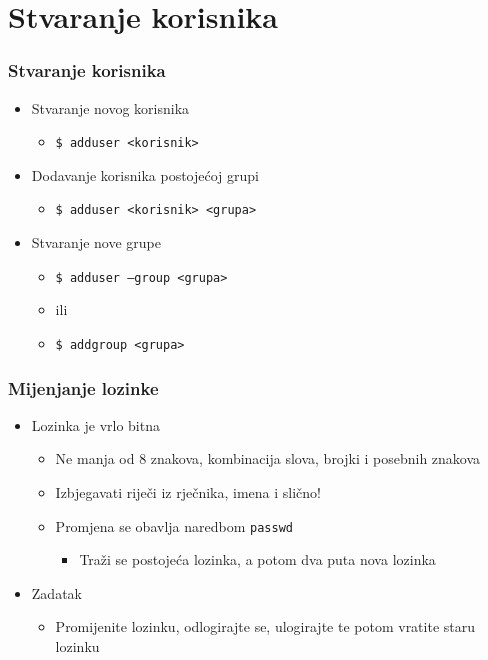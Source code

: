 \documentclass{beamer}
\newcommand{\shell}[1]{\texttt{#1}}
\begin{document}
\section{Stvaranje korisnika}
\begin{frame}[t]
\frametitle{Stvaranje korisnika}
\begin{itemize}
  \item Stvaranje novog korisnika
  \begin{itemize}
    \item[] \shell{\$ adduser <korisnik>}
  \end{itemize}
  \item Dodavanje korisnika postojećoj grupi
  \begin{itemize}
    \item[] \shell{\$ adduser <korisnik> <grupa>}
  \end{itemize}
  \item Stvaranje nove grupe
  \begin{itemize}
    \item[] \shell{\$ adduser --group <grupa>}
    \item[] ili
    \item[] \shell{\$ addgroup <grupa>}
  \end{itemize}
\end{itemize}
\end{frame}

\begin{frame}[t]
\frametitle{Mijenjanje lozinke}
\begin{itemize}
  \item Lozinka je vrlo bitna
  \begin{itemize}
    \item Ne manja od 8 znakova, kombinacija slova, brojki i posebnih 
          znakova
    \item Izbjegavati riječi iz rječnika, imena i slično!
    \item Promjena se obavlja naredbom \shell{passwd}
    \begin{itemize}
      \item Traži se postojeća lozinka, a potom dva puta nova lozinka
    \end{itemize}
  \end{itemize}
  \item Zadatak
  \begin{itemize}
    \item Promijenite lozinku, odlogirajte se, ulogirajte te potom vratite
          staru lozinku
  \end{itemize}
\end{itemize}
\end{frame}
\end{document}
